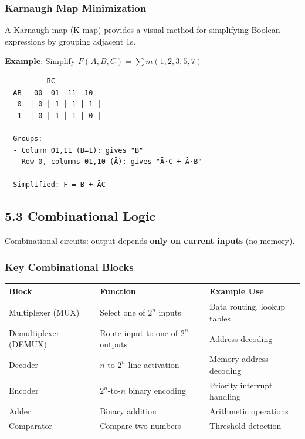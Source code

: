 \documentclass[11pt,a4paper]{book}
\begin{document}
\subsubsection{Karnaugh Map Minimization}

A Karnaugh map (K-map) provides a visual method for simplifying Boolean expressions by grouping adjacent 1s.

\textbf{Example}: Simplify $F(A,B,C) = \sum m(1,2,3,5,7)$

\begin{lstlisting}
          BC
  AB   00  01  11  10
   0  │ 0 │ 1 │ 1 │ 1 │
   1  │ 0 │ 1 │ 1 │ 0 │
   
  Groups:
  - Column 01,11 (B=1): gives "B"
  - Row 0, columns 01,10 (Ā): gives "Ā·C + Ā·B" 
  
  Simplified: F = B + ĀC
\end{lstlisting}

\medskip\noindent\hrulefill\medskip

\subsection{5.3 Combinational Logic}

Combinational circuits: output depends \textbf{only on current inputs} (no memory).

\subsubsection{Key Combinational Blocks}

\begin{center}
\begin{tabular}{|l|l|l|}
\hline
Block & Function & Example Use \\
\hline
Multiplexer (MUX) & Select one of $2^n$ inputs & Data routing, lookup tables \\
Demultiplexer (DEMUX) & Route input to one of $2^n$ outputs & Address decoding \\
Decoder & $n$-to-$2^n$ line activation & Memory address decoding \\
Encoder & $2^n$-to-$n$ binary encoding & Priority interrupt handling \\
Adder & Binary addition & Arithmetic operations \\
Comparator & Compare two numbers & Threshold detection \\
\hline
\end{tabular}
\end{center}
\end{document}
